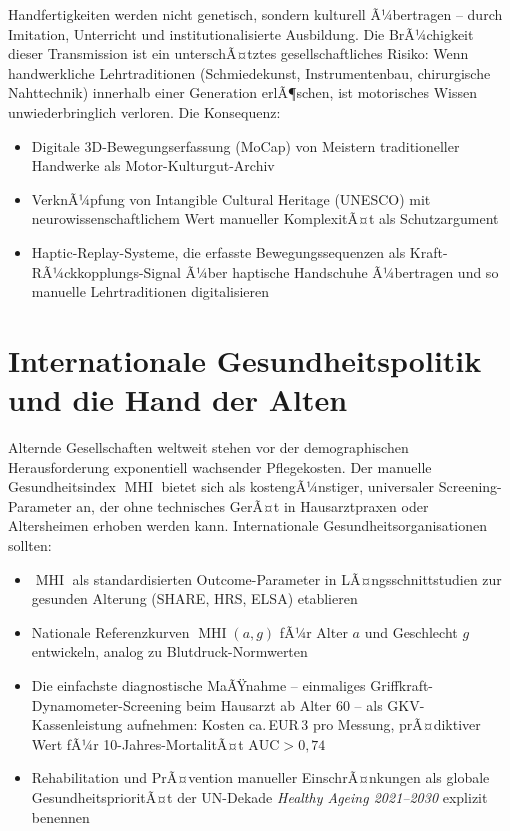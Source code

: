 ﻿\documentclass[12pt,a4paper]{report}
\theoremstyle{plain}
\theoremstyle{definition}
\theoremstyle{remark}
\DeclareMathOperator{\MHI}{MHI}
\begin{document}
Handfertigkeiten werden nicht genetisch, sondern kulturell Ã¼bertragen --
durch Imitation, Unterricht und institutionalisierte Ausbildung. Die
BrÃ¼chigkeit dieser Transmission ist ein unterschÃ¤tztes gesellschaftliches
Risiko: Wenn handwerkliche Lehrtraditionen (Schmiedekunst, Instrumentenbau,
chirurgische Nahttechnik) innerhalb einer Generation erlÃ¶schen, ist
motorisches Wissen unwiederbringlich verloren. Die Konsequenz:

\begin{itemize}
\item Digitale 3D-Bewegungserfassung (MoCap) von Meistern traditioneller
  Handwerke als Motor-Kulturgut-Archiv
\item VerknÃ¼pfung von Intangible Cultural Heritage (UNESCO) mit
  neurowissenschaftlichem Wert manueller KomplexitÃ¤t als Schutzargument
\item Haptic-Replay-Systeme, die erfasste Bewegungssequenzen als
  Kraft-RÃ¼ckkopplungs-Signal Ã¼ber haptische Handschuhe Ã¼bertragen
  und so manuelle Lehrtraditionen digitalisieren
\end{itemize}

\section{Internationale Gesundheitspolitik und die Hand der Alten}

Alternde Gesellschaften weltweit stehen vor der demographischen
Herausforderung exponentiell wachsender Pflegekosten. Der manuelle
Gesundheitsindex $\MHI$ bietet sich als
kostengÃ¼nstiger, universaler Screening-Parameter an, der ohne technisches
GerÃ¤t in Hausarztpraxen oder Altersheimen erhoben werden kann.
Internationale Gesundheitsorganisationen sollten:

\begin{itemize}
\item $\MHI$ als standardisierten Outcome-Parameter in LÃ¤ngsschnittstudien
  zur gesunden Alterung (SHARE, HRS, ELSA) etablieren
\item Nationale Referenzkurven $\MHI(a, g)$ fÃ¼r Alter $a$ und Geschlecht
  $g$ entwickeln, analog zu Blutdruck-Normwerten
\item Die einfachste diagnostische MaÃŸnahme -- einmaliges Griffkraft-
  Dynamometer-Screening beim Hausarzt ab Alter 60 -- als GKV-Kassenleistung
  aufnehmen: Kosten ca.\,EUR\,3 pro Messung, prÃ¤diktiver Wert fÃ¼r
  10-Jahres-MortalitÃ¤t $\text{AUC} > 0{,}74$
\item Rehabilitation und PrÃ¤vention manueller EinschrÃ¤nkungen als globale
  GesundheitsprioritÃ¤t der UN-Dekade \emph{Healthy Ageing 2021--2030}
  explizit benennen
\end{itemize}
\end{document}
